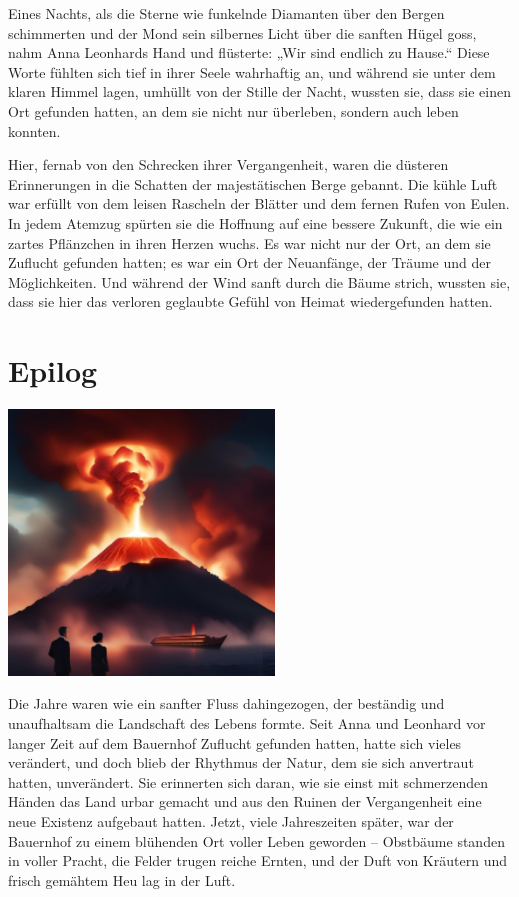 \documentclass[
]{article}
\begin{document}
Eines Nachts, als die Sterne wie funkelnde Diamanten über den Bergen
schimmerten und der Mond sein silbernes Licht über die sanften Hügel
goss, nahm Anna Leonhards Hand und flüsterte: „Wir sind endlich zu
Hause.`` Diese Worte fühlten sich tief in ihrer Seele wahrhaftig an, und
während sie unter dem klaren Himmel lagen, umhüllt von der Stille der
Nacht, wussten sie, dass sie einen Ort gefunden hatten, an dem sie nicht
nur überleben, sondern auch leben konnten.

Hier, fernab von den Schrecken ihrer Vergangenheit, waren die düsteren
Erinnerungen in die Schatten der majestätischen Berge gebannt. Die kühle
Luft war erfüllt von dem leisen Rascheln der Blätter und dem fernen
Rufen von Eulen. In jedem Atemzug spürten sie die Hoffnung auf eine
bessere Zukunft, die wie ein zartes Pflänzchen in ihren Herzen wuchs. Es
war nicht nur der Ort, an dem sie Zuflucht gefunden hatten; es war ein
Ort der Neuanfänge, der Träume und der Möglichkeiten. Und während der
Wind sanft durch die Bäume strich, wussten sie, dass sie hier das
verloren geglaubte Gefühl von Heimat wiedergefunden hatten.

\section{Epilog}\label{epilog}

\includegraphics[width=2.78439in,height=2.7785in]{media/image6.png}

Die Jahre waren wie ein sanfter Fluss dahingezogen, der beständig und
unaufhaltsam die Landschaft des Lebens formte. Seit Anna und Leonhard
vor langer Zeit auf dem Bauernhof Zuflucht gefunden hatten, hatte sich
vieles verändert, und doch blieb der Rhythmus der Natur, dem sie sich
anvertraut hatten, unverändert. Sie erinnerten sich daran, wie sie einst
mit schmerzenden Händen das Land urbar gemacht und aus den Ruinen der
Vergangenheit eine neue Existenz aufgebaut hatten. Jetzt, viele
Jahreszeiten später, war der Bauernhof zu einem blühenden Ort voller
Leben geworden -- Obstbäume standen in voller Pracht, die Felder trugen
reiche Ernten, und der Duft von Kräutern und frisch gemähtem Heu lag in
der Luft.
\end{document}

